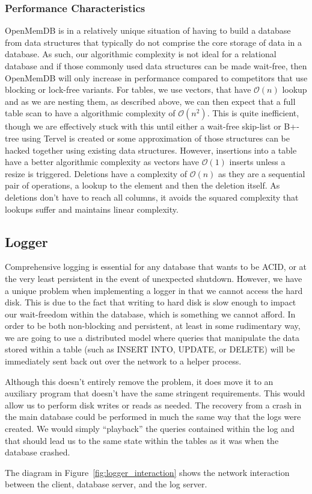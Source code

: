 \documentclass[letterpaper, 11pt]{article}
\begin{document}
\subsubsection{Performance Characteristics}
OpenMemDB is in a relatively unique situation of having to build a database from data structures that typically do not
comprise the core storage of data in a database. As such, our algorithmic complexity is not ideal for a relational database
and if those commonly used data structures can be made wait-free, then OpenMemDB will only increase in performance compared
to competitors that use blocking or lock-free variants. For tables, we use vectors, that have $\mathcal{O}(n)$ lookup and 
as we are nesting them, as described above, we can then expect that a full table scan to have a algorithmic complexity 
of $\mathcal{O}(n^2)$. This is quite inefficient, though we are effectively stuck with this until either a wait-free 
skip-list or B+-tree using Tervel is created or some approximation of those structures can be hacked together using 
existing data structures. However, insertions into a table have a better algorithmic complexity as vectors have 
$\mathcal{O}(1)$ inserts unless a resize is triggered. Deletions have a complexity of $\mathcal{O}(n)$ as they are a 
sequential pair of operations, a lookup to the element and then the deletion itself. As deletions don't have to reach all
columns, it avoids the squared complexity that lookups suffer and maintains linear complexity.

\newpage


  \subsection{Logger}
  Comprehensive logging is essential for any database that wants to be ACID, or
  at the very least persistent in the event of unexpected shutdown. However, we
  have a unique problem when implementing a logger in that we cannot access the
  hard disk. This is due to the fact that writing to hard disk is slow enough to
  impact our wait-freedom within the database, which is something we cannot afford.
  In order to be both non-blocking and persistent, at least in some rudimentary way,
  we are going to use a distributed model where queries that manipulate the data
  stored within a table (such as INSERT INTO, UPDATE, or DELETE) will be immediately
  sent back out over the network to a helper process.
  \par\vspace{\baselineskip}
  Although this doesn't entirely remove the problem, it does move it to an auxiliary
  program that doesn't have the same stringent requirements. This would allow us to
  perform disk writes or reads as needed. The recovery from a crash in the main database
  could be performed in much the same way that the logs were created. We would simply
  ``playback'' the queries contained within the log and that should lead us to the same
  state within the tables as it was when the database crashed.
  \par\vspace{\baselineskip}
  The diagram in Figure~\ref{fig:logger_interaction} shows the network interaction between
  the client, database server, and the log server.
  
\end{document}
